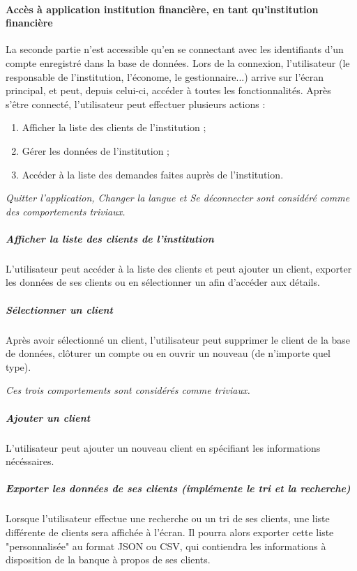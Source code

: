 \paragraph{Accès à application institution financière, en tant qu'institution financière} La seconde partie n'est accessible qu'en se connectant avec les identifiants d'un compte enregistré dans la base de données. Lors de la connexion, l'utilisateur (le responsable de l'institution, l'économe, le gestionnaire...) arrive sur l'écran principal, et peut, depuis celui-ci, accéder à toutes les fonctionnalités. Après s'être connecté, l'utilisateur peut effectuer plusieurs actions :
\begin{enumerate}
\item Afficher la liste des clients de l'institution ;
\item Gérer les données de l'institution ;
\item Accéder à la liste des demandes faites auprès de l'institution.
\end{enumerate}
\begin{scriptsize}
\textit{\emph{Quitter l'application}, \emph{Changer la langue} et \emph{Se déconnecter} sont considéré comme des comportements triviaux.}
\end{scriptsize}


\subparagraph{Afficher la liste des clients de l'institution}
L'utilisateur peut accéder à la liste des clients et peut ajouter un client, exporter les données de ses clients ou en sélectionner un afin d'accéder aux détails.


\subparagraph{Sélectionner un client}
Après avoir sélectionné un client, l'utilisateur peut supprimer le client de la base de données, clôturer un compte ou en ouvrir un nouveau (de n'importe quel type).
\begin{scriptsize}
\textit{Ces trois comportements sont considérés comme triviaux.}
\end{scriptsize}


\subparagraph{Ajouter un client}
L'utilisateur peut ajouter un nouveau client en spécifiant les informations nécéssaires.


\subparagraph{Exporter les données de ses clients (implémente le tri et la recherche)}
Lorsque l'utilisateur effectue une recherche ou un tri de ses clients, une liste différente de clients sera affichée à l'écran. Il pourra alors exporter cette liste "personnalisée" au format JSON ou CSV, qui contiendra les informations à disposition de la banque à propos de ses clients.


